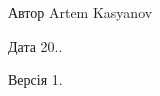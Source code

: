 \begin{DoxyAuthor}{Автор}
Artem Kasyanov 
\end{DoxyAuthor}
\begin{DoxyDate}{Дата}
20.. 
\end{DoxyDate}
\begin{DoxyVersion}{Версія}
1. 
\end{DoxyVersion}
